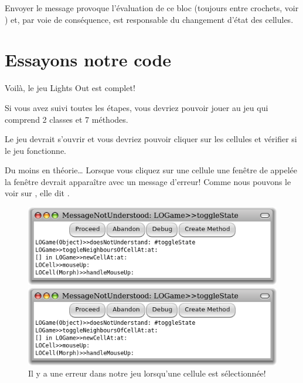 \documentclass[a4paper,10pt,twoside]{book}
\begin{document}

\noindent
Envoyer le message  provoque l'évaluation de ce bloc
(toujours entre crochets, voir ) et, par voie de
conséquence, est responsable du changement d'état des cellules.

\section{Essayons notre code}

Voilà, le jeu Lights Out est complet!

Si vous avez suivi toutes les étapes, vous devriez pouvoir jouer au jeu qui comprend 2 classes et 7 méthodes.


Le jeu devrait s'ouvrir et vous devriez pouvoir cliquer sur les cellules et vérifier si le jeu fonctionne.

Du moins en théorie\ldots{}
Lorsque vous cliquez sur une cellule une fenêtre de  appelée la fenêtre  devrait apparaître avec un message d'erreur!
Comme nous pouvons le voir sur , elle dit .

\begin{figure}[ht]
\ifluluelse
	{\centerline{\includegraphics[width=\textwidth]{Error}}}
	{\centerline{\includegraphics[scale=0.7]{Error}}}
\caption{Il y a une erreur dans notre jeu lorsqu'une cellule est sélectionnée!
  }
\end{figure}
\end{document}
